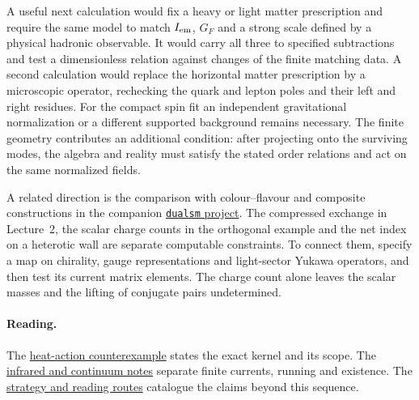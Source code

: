 \documentclass[10pt]{article}
\theoremstyle{definition}
\begin{document}
A useful next calculation would fix a heavy or light matter prescription and require the same model to match \(I_{\rm em}\), \(G_F\) and a strong scale defined by a physical hadronic observable. It would carry all three to specified subtractions and test a dimensionless relation against changes of the finite matching data. A second calculation would replace the horizontal matter prescription by a microscopic operator, rechecking the quark and lepton poles and their left and right residues. For the compact spin fit an independent gravitational normalization or a different supported background remains necessary. The finite geometry contributes an additional condition: after projecting onto the surviving modes, the algebra and reality must satisfy the stated order relations and act on the same normalized fields.

A related direction is the comparison with colour--flavour and composite constructions in the companion \href{https://github.com/arivero/dualsm}{\texttt{dualsm} project}. The compressed exchange in Lecture~2, the scalar charge counts in the orthogonal example and the net index on a heterotic wall are separate computable constraints. To connect them, specify a map on chirality, gauge representations and light-sector Yukawa operators, and then test its current matrix elements. The charge count alone leaves the scalar masses and the lifting of conjugate pairs undetermined.

\paragraph{Reading.} The \href{https://github.com/arivero/conneskk/blob/master/results/18_counterexample_wrong_sign_taylor.md}{heat-action counterexample} states the exact kernel and its scope. The \href{https://github.com/arivero/conneskk/blob/master/results/75_infrared_currents_and_continuum_limits.md}{infrared and continuum notes} separate finite currents, running and existence. The \href{https://github.com/arivero/conneskk/blob/master/STRATEGY.md}{strategy and reading routes} catalogue the claims beyond this sequence.



\end{document}
